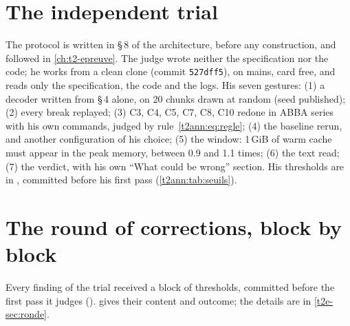 \section{The independent trial}\label{t2ann:sec:epreuve}

The protocol is written in \S\,8 of the architecture, before any construction, and followed in \cref{ch:t2-epreuve}. The judge wrote neither the specification nor the code; he works from a clean clone (commit \texttt{527dff5}), on mains, card free, and reads only the specification, the code and the logs. His seven gestures: (1) a decoder written from \S\,4 alone, on 20 chunks drawn at random (seed published); (2) every break replayed; (3) C3, C4, C5, C7, C8, C10 redone in ABBA series with his own commands, judged by rule~\eqref{t2ann:eq:regle}; (4) the baseline rerun, and another configuration of his choice; (5) the window: 1\,GiB of warm cache must appear in the peak memory, between 0.9 and 1.1 times; (6) the text read; (7) the verdict, with his own \enquote{What could be wrong} section. His thresholds are in , committed before his first pass (\cref{t2ann:tab:seuils}).

\section{The round of corrections, block by block}\label{t2ann:sec:ronde}

Every finding of the trial received a block of thresholds, committed before the first pass it judges ().  gives their content and outcome; the details are in \cref{t2e-sec:ronde}.

